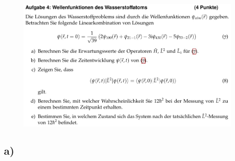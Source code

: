     \begin{figure}[H]
        \centering
        \includegraphics[width=\textwidth]{images/Aufgabe4.jpg}
        \label{fig:5}
    \end{figure}

\subsection{a)}

